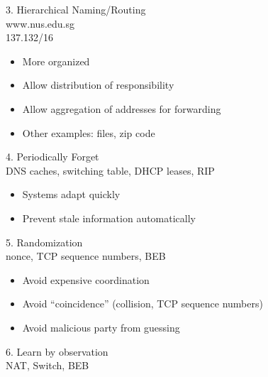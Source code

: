 \begin{cf}
	3. Hierarchical Naming/Routing\\
	\vspace{1cm}
	www.nus.edu.sg\\
	137.132/16
\end{cf}


\begin{cf}{\small
	\begin{itemize}
	\item More organized
	\item Allow distribution of responsibility
  \item Allow aggregation of addresses for forwarding
	\item Other examples: files, zip code
	\end{itemize}
}
\end{cf}

\begin{cf}
	4. Periodically Forget\\
	\vspace{1cm}
	DNS caches, switching table, DHCP leases, RIP
\end{cf}

\begin{cf}{\small
	\begin{itemize}
	\item Systems adapt quickly
	\item Prevent stale information automatically
	\end{itemize}
}
\end{cf}

\begin{cf}
	5. Randomization\\
	\vspace{1cm}
	nonce, TCP sequence numbers, BEB
\end{cf}

\begin{cf}{\small
	\begin{itemize}
	\item Avoid expensive coordination
	\item Avoid ``coincidence'' (collision, TCP sequence numbers)
	\item Avoid malicious party from guessing
	\end{itemize}
}
\end{cf}

\begin{cf}
	6. Learn by observation\\
	\vspace{1cm}
	NAT, Switch, BEB
\end{cf}

